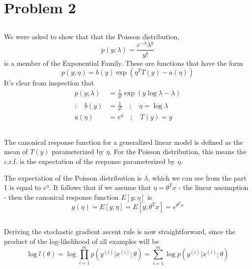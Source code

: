 \documentclass[11pt]{article} %
\begin{document}
\section{Problem 2}

\subsection{}
We were asked to show that that the Poisson distribution,
\[
	p(y; \lambda) = \frac{e^{-\lambda}\lambda^y}{y!}
\]
is a member of the Exponential Family. These are functions that have the form
\[
	p(y; \eta) = b(y)\exp{(\eta^T  T(y) - a(\eta))}
\]
It's clear from inspection that
\begin{equation}
\begin{split}
	p(y; \lambda) &= \frac{1}{y!} \exp{(y\log\lambda - \lambda)} \\
	: \quad b(y) &= \frac{1}{y!} \quad ; \quad \eta = \log\lambda \\
	a(\eta) &= e^\eta \quad ; \quad T(y) = y
\end{split}
\end{equation}

\subsection{}
The canonical response function for a generalized linear model is defined as the mean of $T(y)$ parameterized by $\eta$. For the Poisson distribution, this means the c.r.f. is the expectation of the response parameterized by $\eta$. \par
 The expectation of the Poisson distribution is $\lambda$, which we can see from the part 1 is equal to $e^{\eta}$. It follows that if we assume that $\eta = \theta^Tx$ - the linear assumption - then the canonical response function $E[y ; \eta]$ is
 \[
 	 g(\eta)  = E[y; \eta] = E[y; \theta^T x] = e^{\theta^T x}
 \]
 
 \subsection{}
 Deriving the stochastic gradient ascent rule is now straightforward, since the product of the log-likelihood of all examples will be
 \[
 	 \log l(\theta) = \log \prod_{i = 1}^m p(y^{(i)}|x^{(i)}; \theta) = \sum_{i = 1}^{m}\log p(y^{(i)}|x^{(i)}; \theta)
\]
\end{document}
